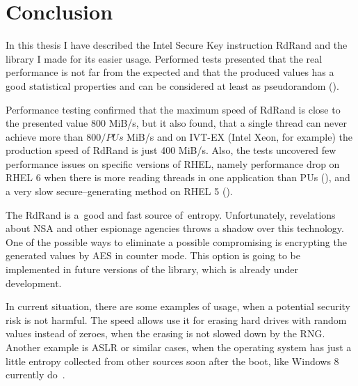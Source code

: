 \chapter{Conclusion}
\par{
In this thesis I have described the Intel Secure Key instruction RdRand and the library I made for its easier usage. Performed tests presented that the real performance is not far from the expected and that the produced values has a good statistical properties and can be considered at least as pseudorandom ().
}

\par{
Performance testing confirmed that the maximum speed of RdRand is close to the presented value 800 MiB/s, but it also found, that a single thread can never achieve more than $800 / PUs$ MiB/s and on IVT-EX (Intel Xeon, for example) the production speed of RdRand is just 400 MiB/s. Also, the tests uncovered few performance issues on specific versions of RHEL, namely performance drop on RHEL 6 when there is more reading threads in one application than PUs (), and a very slow secure--generating method on RHEL 5 ().
}

\par{
The RdRand is a~good and fast source of~entropy. Unfortunately, revelations about NSA and other espionage agencies throws a shadow over this technology. One of the possible ways to eliminate a possible compromising is encrypting the generated values by AES in counter mode. This option is going to be implemented in future versions of the library, which is already under development.
}

\par{
In current situation, there are some examples of usage, when a potential security risk is not harmful. The speed allows use it for erasing hard drives with random values instead of zeroes, when the erasing is not slowed down by the RNG. Another example is ASLR or similar cases, when the operating system has just a little entropy collected from other sources soon after the boot, like Windows 8 currently do~\cite{WindowsASLR}.
}

